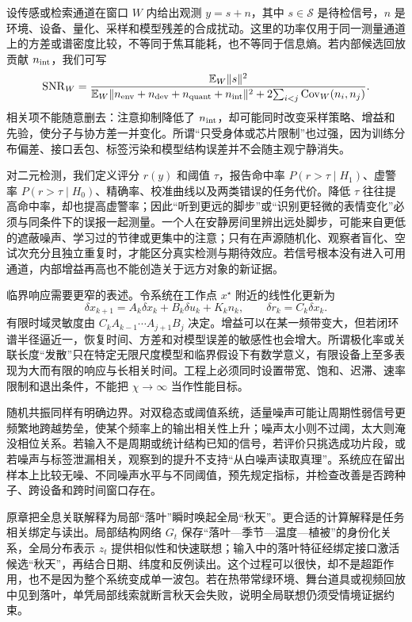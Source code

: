 设传感或检索通道在窗口 $W$ 内给出观测 $y=s+n$，其中 $s\in\mathcal S$ 是待检信号，$n$ 是环境、设备、量化、采样和模型残差的合成扰动。这里的功率仅用于同一测量通道上的方差或谱密度比较，不等同于焦耳能耗，也不等同于信息熵。若内部候选回放贡献 $n_{\rm int}$，我们可写
\[
 \operatorname{SNR}_W=
 \frac{\mathbb E_W\|s\|^2}
 {\mathbb E_W\|n_{\rm env}+n_{\rm dev}+n_{\rm quant}+n_{\rm int}\|^2
 +2\!\sum_{i<j}\operatorname{Cov}_W(n_i,n_j)} .
\]
相关项不能随意删去：注意抑制降低了 $n_{\rm int}$，却可能同时改变采样策略、增益和先验，使分子与协方差一并变化。所谓“只受身体或芯片限制”也过强，因为训练分布偏差、接口丢包、标签污染和模型结构误差并不会随主观宁静消失。

对二元检测，我们定义评分 $r(y)$ 和阈值 $\tau$，报告命中率 $P(r>\tau\mid H_1)$、虚警率 $P(r>\tau\mid H_0)$、精确率、校准曲线以及两类错误的任务代价。降低 $\tau$ 往往提高命中率，却也提高虚警率；因此“听到更远的脚步”或“识别更轻微的表情变化”必须与同条件下的误报一起测量。一个人在安静房间里辨出远处脚步，可能来自更低的遮蔽噪声、学习过的节律或更集中的注意；只有在声源随机化、观察者盲化、空试次充分且独立重复时，才能区分真实检测与期待效应。若信号根本没有进入可用通道，内部增益再高也不能创造关于远方对象的新证据。

临界响应需要更窄的表述。令系统在工作点 $x^\star$ 附近的线性化更新为
\[
 \delta x_{k+1}=A_k\delta x_k+B_k\delta u_k+K_k n_k,
 \qquad \delta r_k=C_k\delta x_k .
\]
有限时域灵敏度由 $C_kA_{k-1}\cdots A_{j+1}B_j$ 决定。增益可以在某一频带变大，但若闭环谱半径逼近一，恢复时间、方差和对模型误差的敏感性也会增大。所谓极化率或关联长度“发散”只在特定无限尺度模型和临界假设下有数学意义，有限设备上至多表现为大而有限的响应与长相关时间。工程上必须同时设置带宽、饱和、迟滞、速率限制和退出条件，不能把 $\chi\to\infty$ 当作性能目标。

随机共振同样有明确边界。对双稳态或阈值系统，适量噪声可能让周期性弱信号更频繁地跨越势垒，使某个频率上的输出相关性上升；噪声太小则不过阈，太大则淹没相位关系。若输入不是周期或统计结构已知的信号，若评价只挑选成功片段，或若噪声与标签泄漏相关，观察到的提升不支持“从白噪声读取真理”。系统应在留出样本上比较无噪、不同噪声水平与不同阈值，预先规定指标，并检查改善是否跨种子、跨设备和跨时间窗口存在。

原章把全息关联解释为局部“落叶”瞬时唤起全局“秋天”。更合适的计算解释是任务相关绑定与读出。局部结构网络 $G_t$ 保存“落叶—季节—温度—植被”的身份化关系，全局分布表示 $z_t$ 提供相似性和快速联想；输入中的落叶特征经绑定接口激活候选“秋天”，再结合日期、纬度和反例读出。这个过程可以很快，却不是超距作用，也不是因为整个系统变成单一波包。若在热带常绿环境、舞台道具或视频回放中见到落叶，单凭局部线索就断言秋天会失败，说明全局联想仍须受情境证据约束。

